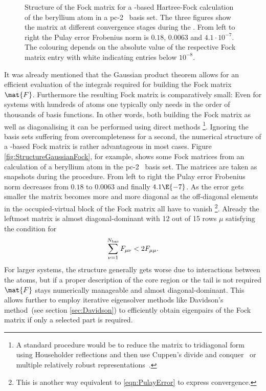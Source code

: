 \begin{figure}
	\centering
	\caption[Structure of the Fock matrix for a \cGTO-based Hartree-Fock]
		{Structure of the Fock matrix for a \cGTO-based Hartree-Fock
		calculation
		of the beryllium atom
		in a pc-2~\cite{Jensen2007} basis set.
		The three figures show the matrix
		at different convergence stages during the \SCF.
		From left to right the Pulay error
		Frobenius norm is $0.18$, $0.0063$ and $4.1 \cdot 10^{-7}$.
		The colouring depends on the absolute value
		of the respective Fock matrix entry
		with white indicating entries below $10^{-8}$.
	}
	\label{fig:StructureGaussianFock}
\end{figure}
It was already mentioned that the Gaussian product theorem
allows for an efficient evaluation of the integrals
required for building the Fock matrix $\mat{F}$.
Furthermore the resulting Fock matrix is comparatively small:
Even for systems with hundreds of atoms one typically only needs
in the order of thousands of basis functions.
In other words, both building the Fock matrix
as well as diagonalising it can be performed using direct methods%
\footnote{%
	A standard procedure would be to reduce the matrix to
	tridiagonal form using Householder reflections
	and then use Cuppen's divide and conquer~\cite{Arbenz2010}
	or multiple relatively robust representations~\cite{Dhillon2006}.
}.
Ignoring the basis sets suffering from overcompleteness for a second,
the numerical structure of a \cGTO-based Fock matrix
is rather advantageous in most cases.
Figure \vref{fig:StructureGaussianFock}, for example,
shows some Fock matrices from an \SCF calculation
of a beryllium atom
in the pc-2~\cite{Jensen2007} basis set.
The matrices are taken as snapshots during the \SCF procedure.
From left to right the Pulay error Frobenius norm decreases
from $0.18$ to $0.0063$ and finally $4.1\E{-7}$.
As the error gets smaller the matrix becomes more and more diagonal
as the off-diagonal elements in the occupied-virtual block of the
Fock matrix all have to vanish%
\footnote{This is another way equivalent to \eqref{eqn:PulayError}
to express \SCF convergence.}.
Already the leftmost matrix is almost diagonal-dominant with 12
out of 15 rows $\mu$
satisfying the condition for 
\[
	\sum_{\nu=1}^{N_\text{bas}} F_{\mu\nu} < 2 F_{\mu\mu}.
\]
For larger systems, the structure generally gets
worse due to interactions between the atoms,
but if a proper description of the core region or the tail is not required
$\mat{F}$ stays numerically manageable and almost diagonal-dominant.
This allows further to employ
iterative eigensolver methods like Davidson's method~(see section \vref{sec:Davidson})
to efficiently obtain eigenpairs of the Fock matrix if only a
selected part is required.

